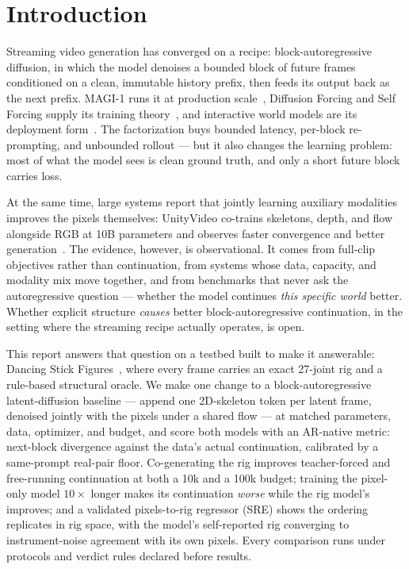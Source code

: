 \documentclass[10pt,twocolumn]{article}
\begin{document}
\section{Introduction}
Streaming video generation has converged on a recipe: block-autoregressive diffusion, in which the model denoises a
bounded block of future frames conditioned on a clean, immutable history prefix, then feeds its output back as the
next prefix. MAGI-1 runs it at production scale~\cite{magi2025}, Diffusion Forcing and Self Forcing supply its
training theory~\cite{chen2024diffusionforcing,huang2025selfforcing}, and interactive world models are its deployment
form~\cite{yin2026evoke}. The factorization buys bounded latency, per-block re-prompting, and unbounded rollout —
but it also changes the learning problem: most of what the model sees is clean ground truth, and only a short
future block carries loss.

At the same time, large systems report that jointly learning auxiliary modalities improves the pixels themselves:
UnityVideo co-trains skeletons, depth, and flow alongside RGB at 10B parameters and observes faster convergence and
better generation~\cite{huang2025unityvideo}. The evidence, however, is observational. It comes from full-clip
objectives rather than continuation, from systems whose data, capacity, and modality mix move together, and from
benchmarks that never ask the autoregressive question — whether the model continues \emph{this specific world}
better. Whether explicit structure \emph{causes} better block-autoregressive continuation, in the setting where the
streaming recipe actually operates, is open.

This report answers that question on a testbed built to make it answerable: Dancing Stick Figures~\cite{cho2026dsf},
where every frame carries an exact 27-joint rig and a rule-based structural oracle. We make one change to a
block-autoregressive latent-diffusion baseline — append one 2D-skeleton token per latent frame, denoised jointly
with the pixels under a shared flow — at matched parameters, data, optimizer, and budget, and score both models with
an AR-native metric: next-block divergence against the data's actual continuation, calibrated by a same-prompt
real-pair floor. Co-generating the rig improves teacher-forced and free-running continuation at both a 10k and a
100k budget; training the pixel-only model $10\times$ longer makes its continuation \emph{worse} while the rig
model's improves; and a validated pixels-to-rig regressor (SRE) shows the ordering replicates in rig space, with the
model's self-reported rig converging to instrument-noise agreement with its own pixels. Every comparison runs under
protocols and verdict rules declared before results.
\end{document}

